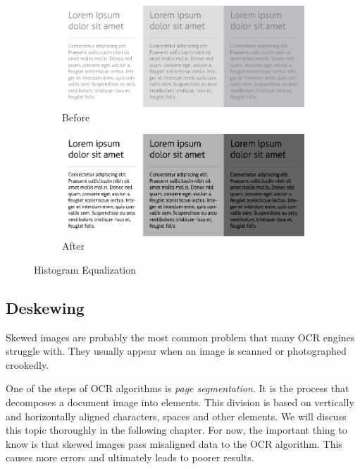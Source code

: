 \begin{figure}[H]
\centering
\begin{subfigure}{0.31\textwidth}
\includegraphics[width=\linewidth]{img/preprocessing/contrast_low.png}
\caption{Before} \label{fig:1a}
\end{subfigure}
\qquad
\begin{subfigure}{0.31\textwidth}
\includegraphics[width=\linewidth]{img/preprocessing/contrast_high.png}
\caption{After}
\end{subfigure}
\caption{Histogram Equalization}
\end{figure}


\subsection{Deskewing}

Skewed images are probably the most common problem that many OCR engines struggle with. They usually appear when an image is scanned or photographed crookedly. 

One of the steps of OCR algorithms is \emph{page segmentation}. It is the process that decomposes a document image into elements. This division is based on vertically and horizontally aligned characters, spaces and other elements. We will discuss this topic thoroughly in the following chapter. For now, the important thing to know is that skewed images pass misaligned data to the OCR algorithm. This causes more errors and ultimately leads to poorer results.


